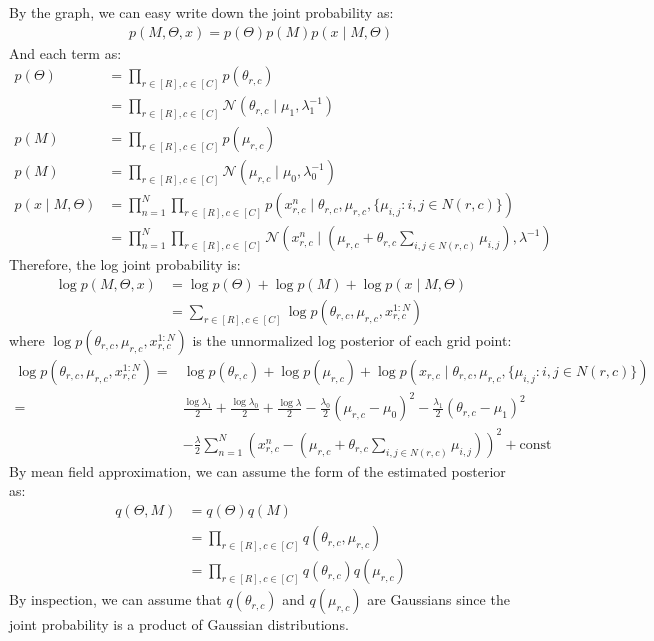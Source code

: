 \documentclass[12pt]{article}
\newenvironment{problem}[2][Problem]{\begin{trivlist}
\item[\hskip \labelsep {\bfseries #1}\hskip \labelsep {\bfseries #2.}]}{\end{trivlist}}
\begin{document}
\begin{problem}{2.9.25}
By the graph, we can easy write down the joint probability as:
\begin{align*}
    p(M, \Theta, x) = p(\Theta)p(M)p(x \mid M, \Theta)
\end{align*}
And each term as:
\begin{align*}
    p(\Theta) &= \prod_{r \in [R], c\in [C]} p(\theta_{r,c}) \\
        &= \prod_{r \in [R], c\in [C]} \mathcal{N}(\theta_{r,c}\mid \mu_{1}, \lambda_{1}^{-1}) \\
    p(M) &= \prod_{r \in [R], c\in [C]} p(\mu_{r,c}) \\
    p(M) &= \prod_{r \in [R], c\in [C]} \mathcal{N}(\mu_{r,c}\mid \mu_{0}, \lambda_{0}^{-1}) \\
    p(x \mid M, \Theta)
        &= \prod_{n=1}^{N}\prod_{r \in [R], c\in [C]} 
                p(x^{n}_{r,c}\mid \theta_{r,c}, \mu_{r,c}, \{\mu_{i,j}: i, j \in N(r,c)\})\\
        &= \prod_{n=1}^{N}\prod_{r \in [R], c\in [C]} \mathcal{N}(x^{n}_{r,c} \mid  
            (\mu_{r,c} + \theta_{r,c}\sum_{i,j \in N(r,c)}\mu_{i,j}), \lambda^{-1})
\end{align*}
Therefore, the log joint probability is:
\begin{align*}
    \log p(M, \Theta, x) &= \log p(\Theta) + \log p(M) + \log p(x \mid M, \Theta) \\
        & = \sum_{r \in [R], c\in [C]} \log p(\theta_{r,c}, \mu_{r,c}, x^{1:N}_{r,c})
\end{align*}
where $\log p(\theta_{r,c}, \mu_{r,c}, x^{1:N}_{r,c})$ is the unnormalized log posterior
of each grid point:
\begin{align*}
    \log p(\theta_{r,c}, \mu_{r,c}, x^{1:N}_{r,c}) =& 
    \log p(\theta_{r,c}) + \log p(\mu_{r,c}) 
        + \log p(x_{r,c}\mid \theta_{r,c}, \mu_{r,c}, \{\mu_{i,j}: i, j \in N(r,c)\}) \\
    =& \frac{\log \lambda_1}{2} + \frac{\log \lambda_0}{2} + \frac{\log \lambda}{2} 
       - \frac{\lambda_0}{2}(\mu_{r,c} - \mu_0)^2 - \frac{\lambda_1}{2}(\theta_{r,c} - \mu_1)^2 \\
     & - \frac{\lambda}{2}\sum_{n=1}^{N}(x^n_{r,c} - (\mu_{r,c} + \theta_{r,c}\sum_{i,j \in N(r,c)}\mu_{i,j}))^2
       + \text{const}
\end{align*}
By mean field approximation, we can assume the form of the estimated posterior as:
\begin{align*}
    q(\Theta, M) &= q(\Theta)q(M) \\
                 &= \prod_{r \in [R], c\in [C]} q(\theta_{r,c}, \mu_{r,c}) \\
                 &= \prod_{r \in [R], c\in [C]} q(\theta_{r,c})q(\mu_{r,c})
\end{align*}
By inspection, we can assume that $q(\theta_{r,c})$ and $q(\mu_{r,c})$ are Gaussians
since the joint probability is a product of Gaussian distributions.


\end{problem}
\end{document}
